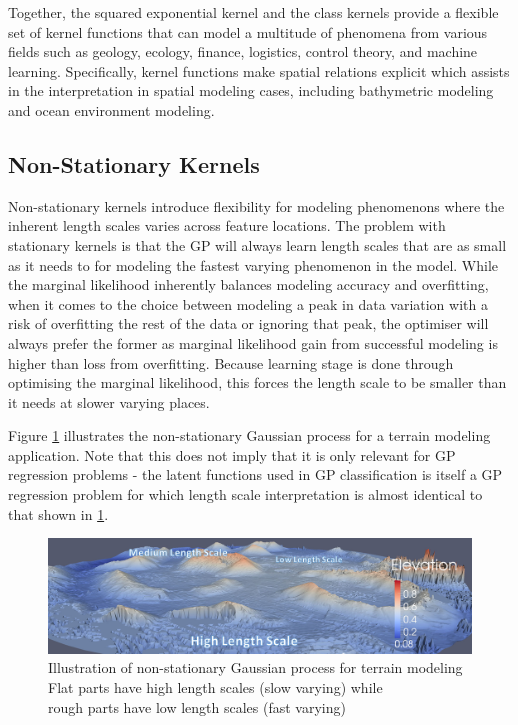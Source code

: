 			Together, the squared exponential kernel and the \matern class kernels provide a flexible set of kernel functions that can model a multitude of phenomena from various fields such as geology, ecology, finance, logistics, control theory, and machine learning. Specifically, kernel functions make spatial relations explicit which assists in the interpretation in spatial modeling cases, including bathymetric modeling and ocean environment modeling.
		
		\subsection{Non-Stationary Kernels}
			
			Non-stationary kernels introduce flexibility for modeling phenomenons where the inherent length scales varies across feature locations. The problem with stationary kernels is that the GP will always learn length scales that are as small as it needs to for modeling the fastest varying phenomenon in the model. While the marginal likelihood inherently balances modeling accuracy and overfitting, when it comes to the choice between modeling a peak in data variation with a risk of overfitting the rest of the data or ignoring that peak, the optimiser will always prefer the former as marginal likelihood gain from successful modeling is higher than loss from overfitting. Because learning stage is done through optimising the marginal likelihood, this forces the length scale to be smaller than it needs at slower varying places.

			Figure \ref{Background:GaussianProcess:Figure:gaussianprocesslengthscale} illustrates the non-stationary Gaussian process for a terrain modeling application. Note that this does not imply that it is only relevant for GP regression problems - the latent functions used in GP classification is itself a GP regression problem for which length scale interpretation is almost identical to that shown in \cref{Background:GaussianProcess:Figure:gaussianprocesslengthscale}.
			
			\begin{figure}[!htbp]
				\centering
					\includegraphics[width=\textwidth]{Figures/gaussianprocesslengthscale.png}
				\caption{Illustration of non-stationary Gaussian process for terrain modeling \cite{GaussianProcessTerrainFigure} \\
				Flat parts have high length scales (slow varying) while \\ rough parts have low length scales (fast varying)}
				\label{Background:GaussianProcess:Figure:gaussianprocesslengthscale}
			\end{figure}
			
